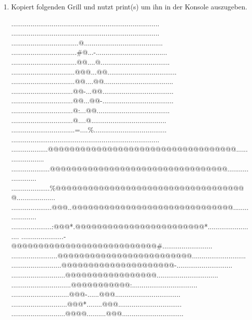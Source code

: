 \documentclass{../../sheet}
\begin{document}
\begin{enumerate}
    \item Kopiert folgenden Grill und nutzt print(s) um ihn in der Konsole auszugeben.
          \begin{ausgabe}
              .............................................................................
              .............................................................................
              ...................................@.........................................
              ..................................\#@...-.....................................
              ..................................@@....@....................................
              .................................@@@...@@....................................
              .................................@@....@@....................................
              ................................@@-...@@.....................................
              ................................@@...@@-.....................................
              ................................@:...@@......................................
              ................................@....@.......................................
              .................................=....\%......................................
              .............................................................................
              ...................@@@@@@@@@@@@@@@@@@@@@@@@@@@@@@@@@@@.......................
              ....................@@@@@@@@@@@@@@@@@@@@@@@@@@@@@@@@@........................
              ....................\%@@@@@@@@@@@@@@@@@@@@@@@@@@@@@@@@@@@@....................
              .....................@@@..@@@@@@@@@@@@@@@@@@@@@@@@@@@@@@.....................
              .....................:@@@*.@@@@@@@@@@@@@@@@@@@@@@@@*.........................
              ......................-@@@@@@@@@@@@@@@@@@@@@@@@@@@\#..........................
              ........................@@@@@@@@@@@@@@@@@@@@@@@@@............................
              ..........................@@@@@@@@@@@@@@@@@@@@@-.............................
              ............................@@@@@@@@@@@@@@@@@................................
              ...............................@@@@@@@@@@@:..................................
              ..............................@@@-......@@@..................................
              .............................@@@*........@@@.................................
              ............................@@@@..........@@@................................

\end{ausgabe}
\end{enumerate}
\end{document}
